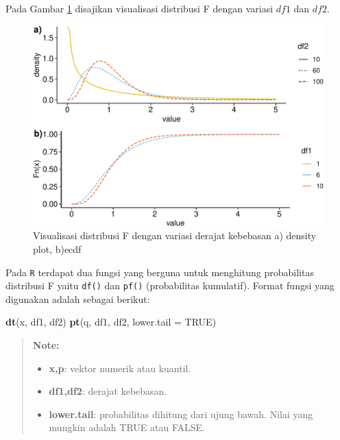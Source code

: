 \documentclass[]{book}
\newenvironment{Shaded}{\begin{snugshade}}{\end{snugshade}}
\newcommand{\KeywordTok}[1]{\textcolor[rgb]{0.13,0.29,0.53}{\textbf{#1}}}
\newcommand{\DataTypeTok}[1]{\textcolor[rgb]{0.13,0.29,0.53}{#1}}
\newcommand{\OtherTok}[1]{\textcolor[rgb]{0.56,0.35,0.01}{#1}}
\newcommand{\NormalTok}[1]{#1}
\providecommand{\tightlist}{%
  \setlength{\itemsep}{0pt}\setlength{\parskip}{0pt}}
\begin{document}
Pada Gambar \ref{fig:dFvis} disajikan visualisasi distribusi F dengan
variasi \(df1\) dan \(df2\).

\begin{figure}

{\centering \includegraphics[width=0.9\linewidth]{EnvStat_files/figure-latex/dFvis-1} 

}

\caption{Visualisasi distribusi F dengan variasi derajat kebebasan a) density plot, b)ecdf}\label{fig:dFvis}
\end{figure}

Pada \texttt{R} terdapat dua fungsi yang berguna untuk menghitung
probabilitas distribusi F yaitu \texttt{df()} dan \texttt{pf()}
(probabilitas kumulatif). Format fungsi yang digunakan adalah sebagai
berikut:

\begin{Shaded}
\begin{Highlighting}[]
\KeywordTok{dt}\NormalTok{(x, df1, df2)}
\KeywordTok{pt}\NormalTok{(q, df1, df2, }\DataTypeTok{lower.tail =} \OtherTok{TRUE}\NormalTok{)}
\end{Highlighting}
\end{Shaded}

\begin{quote}
\textbf{Note: }

\begin{itemize}
\tightlist
\item
  \textbf{x,p}: vektor numerik atau kuantil.
\item
  \textbf{df1,df2}: derajat kebebasan.
\item
  \textbf{lower.tail}: probabilitas dihitung dari ujung bawah. Nilai
  yang mungkin adalah TRUE atau FALSE.
\end{itemize}
\end{quote}
\end{document}
